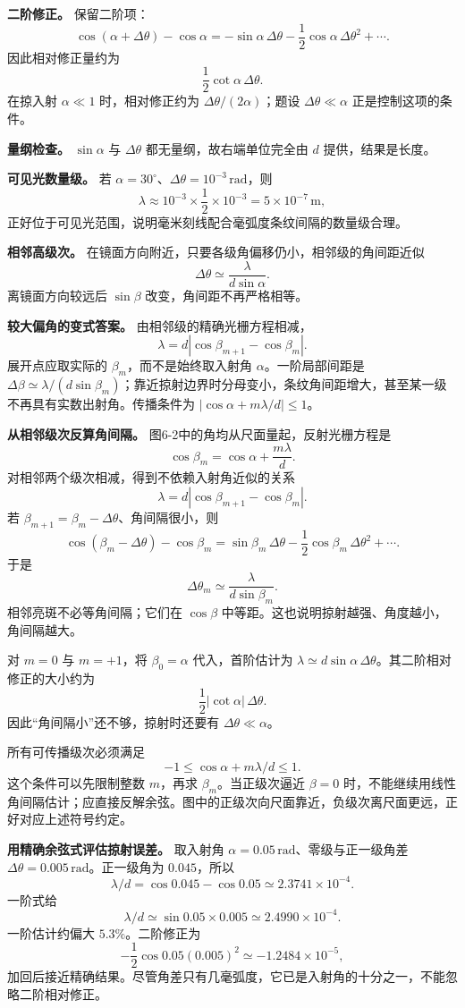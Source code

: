 \documentclass[12pt,a4paper,UTF8]{ctexart}
\begin{document}
\textbf{二阶修正。} 保留二阶项： \[
\cos(\alpha+\Delta\theta)-\cos\alpha
=-\sin\alpha\,\Delta\theta
-\frac12\cos\alpha\,\Delta\theta^2+\cdots. \tag{13}
\] 因此相对修正量约为 \[
\frac12\cot\alpha\,\Delta\theta. \tag{14}
\] 在掠入射 \(\alpha\ll1\) 时，相对修正约为
\(\Delta\theta/(2\alpha)\)；题设 \(\Delta\theta\ll\alpha\)
正是控制这项的条件。

\textbf{量纲检查。} \(\sin\alpha\) 与 \(\Delta\theta\)
都无量纲，故右端单位完全由 \(d\) 提供，结果是长度。

\textbf{可见光数量级。} 若
\(\alpha=30^\circ\)、\(\Delta\theta=10^{-3}\,\mathrm{rad}\)，则 \[
\lambda\approx10^{-3}\times\frac12\times10^{-3}
=5\times10^{-7}\,\mathrm m, \tag{15}
\] 正好位于可见光范围，说明毫米刻线配合毫弧度条纹间隔的数量级合理。

\textbf{相邻高级次。}
在镜面方向附近，只要各级角偏移仍小，相邻级的角间距近似 \[
\Delta\theta\simeq\frac{\lambda}{d\sin\alpha}. \tag{16}
\] 离镜面方向较远后 \(\sin\beta\) 改变，角间距不再严格相等。

\textbf{较大偏角的变式答案。} 由相邻级的精确光栅方程相减， \[
\lambda=d\left|\cos\beta_{m+1}-\cos\beta_m\right|.
\] 展开点应取实际的 \(\beta_m\)，而不是始终取入射角
\(\alpha\)。一阶局部间距是
\(\Delta\beta\simeq\lambda/(d\sin\beta_m)\)；靠近掠射边界时分母变小，条纹角间距增大，甚至某一级不再具有实数出射角。传播条件为
\(|\cos\alpha+m\lambda/d|\le1\)。

\textbf{从相邻级次反算角间隔。} 图6-2中的角均从尺面量起，反射光栅方程是
\[
\cos\beta_m=\cos\alpha+\frac{m\lambda}{d}.
\] 对相邻两个级次相减，得到不依赖入射角近似的关系 \[
\lambda=d|\cos\beta_{m+1}-\cos\beta_m|.
\] 若 \(\beta_{m+1}=\beta_m-\Delta\theta\)、角间隔很小，则 \[
\cos(\beta_m-\Delta\theta)-\cos\beta_m
=\sin\beta_m\,\Delta\theta-\frac12\cos\beta_m\,\Delta\theta^2+\cdots.
\] 于是 \[
\Delta\theta_m\simeq\frac{\lambda}{d\sin\beta_m}.
\] 相邻亮斑不必等角间隔；它们在 \(\cos\beta\)
中等距。这也说明掠射越强、角度越小，角间隔越大。

对 \(m=0\) 与 \(m=+1\)，将 \(\beta_0=\alpha\) 代入，首阶估计为
\(\lambda\simeq d\sin\alpha\,\Delta\theta\)。其二阶相对修正的大小约为 \[
\frac12|\cot\alpha|\,\Delta\theta.
\] 因此``角间隔小''还不够，掠射时还要有 \(\Delta\theta\ll\alpha\)。

所有可传播级次必须满足 \[
-1\le\cos\alpha+m\lambda/d\le1.
\] 这个条件可以先限制整数 \(m\)，再求 \(\beta_m\)。当正级次逼近
\(\beta=0\)
时，不能继续用线性角间隔估计；应直接反解余弦。图中的正级次向尺面靠近，负级次离尺面更远，正好对应上述符号约定。

\textbf{用精确余弦式评估掠射误差。} 取入射角
\(\alpha=0.05\,\mathrm{rad}\)、零级与正一级角差
\(\Delta\theta=0.005\,\mathrm{rad}\)。正一级角为 \(0.045\)，所以 \[
\lambda/d=\cos0.045-\cos0.05\simeq2.3741\times10^{-4}.
\] 一阶式给 \[
\lambda/d\simeq\sin0.05\times0.005\simeq2.4990\times10^{-4}.
\] 一阶估计约偏大 \(5.3\%\)。二阶修正为 \[
-\frac12\cos0.05(0.005)^2\simeq-1.2484\times10^{-5},
\]
加回后接近精确结果。尽管角差只有几毫弧度，它已是入射角的十分之一，不能忽略二阶相对修正。
\end{document}
